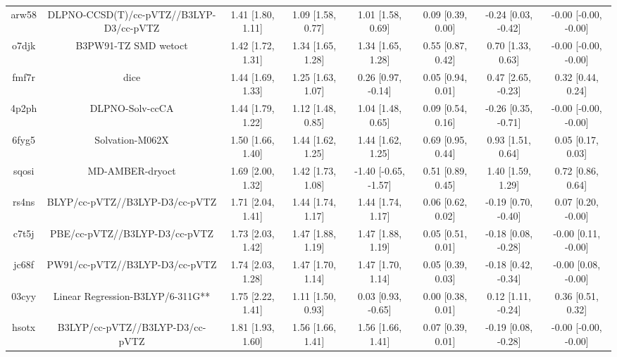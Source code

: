 \documentclass{article}
\begin{document}
\begin{center}
\begin{longtable}{|cccccccc|}
 arw58 &            DLPNO-CCSD(T)/cc-pVTZ//B3LYP-D3/cc-pVTZ &  1.41 [1.80, 1.11] &  1.09 [1.58, 0.77] &     1.01 [1.58, 0.69] &  0.09 [0.39, 0.00] &   -0.24 [0.03, -0.42] &  -0.00 [-0.00, -0.00] \\
 o7djk &                               B3PW91-TZ SMD wetoct &  1.42 [1.72, 1.31] &  1.34 [1.65, 1.28] &     1.34 [1.65, 1.28] &  0.55 [0.87, 0.42] &     0.70 [1.33, 0.63] &  -0.00 [-0.00, -0.00] \\
 fmf7r &                                               dice &  1.44 [1.69, 1.33] &  1.25 [1.63, 1.07] &    0.26 [0.97, -0.14] &  0.05 [0.94, 0.01] &    0.47 [2.65, -0.23] &     0.32 [0.44, 0.24] \\
 4p2ph &                                    DLPNO-Solv-ccCA &  1.44 [1.79, 1.22] &  1.12 [1.48, 0.85] &     1.04 [1.48, 0.65] &  0.09 [0.54, 0.16] &   -0.26 [0.35, -0.71] &  -0.00 [-0.00, -0.00] \\
 6fyg5 &                                    Solvation-M062X &  1.50 [1.66, 1.40] &  1.44 [1.62, 1.25] &     1.44 [1.62, 1.25] &  0.69 [0.95, 0.44] &     0.93 [1.51, 0.64] &     0.05 [0.17, 0.03] \\
 sqosi &                                    MD-AMBER-dryoct &  1.69 [2.00, 1.32] &  1.42 [1.73, 1.08] &  -1.40 [-0.65, -1.57] &  0.51 [0.89, 0.45] &     1.40 [1.59, 1.29] &     0.72 [0.86, 0.64] \\
 rs4ns &                     BLYP/cc-pVTZ//B3LYP-D3/cc-pVTZ &  1.71 [2.04, 1.41] &  1.44 [1.74, 1.17] &     1.44 [1.74, 1.17] &  0.06 [0.62, 0.02] &   -0.19 [0.70, -0.40] &    0.07 [0.20, -0.00] \\
 c7t5j &                      PBE/cc-pVTZ//B3LYP-D3/cc-pVTZ &  1.73 [2.03, 1.42] &  1.47 [1.88, 1.19] &     1.47 [1.88, 1.19] &  0.05 [0.51, 0.01] &   -0.18 [0.08, -0.28] &   -0.00 [0.11, -0.00] \\
 jc68f &                     PW91/cc-pVTZ//B3LYP-D3/cc-pVTZ &  1.74 [2.03, 1.28] &  1.47 [1.70, 1.14] &     1.47 [1.70, 1.14] &  0.05 [0.39, 0.03] &   -0.18 [0.42, -0.34] &   -0.00 [0.08, -0.00] \\
 03cyy &                   Linear Regression-B3LYP/6-311G** &  1.75 [2.22, 1.41] &  1.11 [1.50, 0.93] &    0.03 [0.93, -0.65] &  0.00 [0.38, 0.01] &    0.12 [1.11, -0.24] &     0.36 [0.51, 0.32] \\
 hsotx &                    B3LYP/cc-pVTZ//B3LYP-D3/cc-pVTZ &  1.81 [1.93, 1.60] &  1.56 [1.66, 1.41] &     1.56 [1.66, 1.41] &  0.07 [0.39, 0.01] &   -0.19 [0.08, -0.28] &  -0.00 [-0.00, -0.00] \\

\end{longtable}
\end{center}
\end{document}
